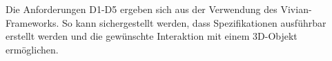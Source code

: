 Die Anforderungen D1-D5 ergeben sich aus der Verwendung des Vivian-Frameworks. So kann sichergestellt werden, dass Spezifikationen ausführbar erstellt werden und die gewünschte Interaktion mit einem 3D-Objekt ermöglichen.






